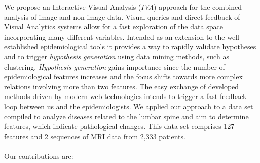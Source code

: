 \documentclass[journal]{style/vgtc} 			          %
\begin{document}
We propose an Interactive Visual Analysis (\emph{IVA}) approach \cite{Thomas2005} for the combined analysis of image and non-image data.
%
Visual queries and direct feedback of Visual Analytics systems allow for a fast exploration of the data space incorporating many different variables.
%
Intended as an extension to the well-established epidemiological tools it provides a way to rapidly validate hypotheses and to trigger \emph{hypothesis generation} using data mining methods, such as clustering.
%
\emph{Hypothesis generation} gains importance since the number of epidemiological features increases and the focus shifts towards more complex relations involving more than two features.
%
The easy exchange of developed methods driven by modern web technologies intends to trigger a fast feedback loop between us and the epidemiologists.
We applied our approach to a data set compiled to analyze diseases related to the lumbar spine and aim to determine features, which indicate pathological changes.
%
This data set comprises 127 features and 2 sequences of MRI data from 2,333 patients.
\\\\
Our contributions are:
\end{document}
